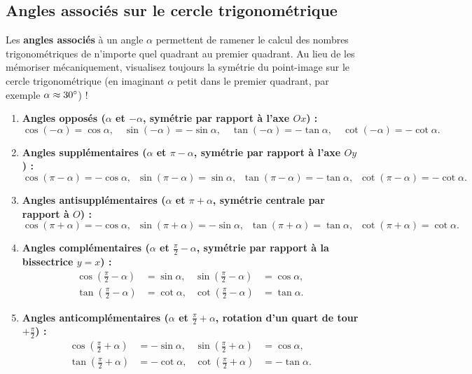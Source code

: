 \subsection{Angles associés sur le cercle trigonométrique}

Les \textbf{angles associés} à un angle $\alpha$ permettent de ramener le calcul des nombres trigonométriques de n'importe quel quadrant au premier quadrant. Au lieu de les mémoriser mécaniquement, visualisez toujours la symétrie du point-image sur le cercle trigonométrique (en imaginant $\alpha$ petit dans le premier quadrant, par exemple $\alpha \approx 30\degree$) !

\begin{theoreme}
\begin{enumerate}
    \item \textbf{Angles opposés ($\alpha$ et $-\alpha$, symétrie par rapport à l'axe $Ox$) :}
    \[
        \cos(-\alpha) = \cos\alpha, \quad \sin(-\alpha) = -\sin\alpha, \quad \tan(-\alpha) = -\tan\alpha, \quad \cot(-\alpha) = -\cot\alpha.
    \]
    \item \textbf{Angles supplémentaires ($\alpha$ et $\pi - \alpha$, symétrie par rapport à l'axe $Oy$) :}
    \[
        \cos(\pi-\alpha) = -\cos\alpha, \;\; \sin(\pi-\alpha) = \sin\alpha, \;\; \tan(\pi-\alpha) = -\tan\alpha, \;\; \cot(\pi-\alpha) = -\cot\alpha.
    \]
    \item \textbf{Angles antisupplémentaires ($\alpha$ et $\pi + \alpha$, symétrie centrale par rapport à $O$) :}
    \[
        \cos(\pi+\alpha) = -\cos\alpha, \;\; \sin(\pi+\alpha) = -\sin\alpha, \;\; \tan(\pi+\alpha) = \tan\alpha, \;\; \cot(\pi+\alpha) = \cot\alpha.
    \]
    \item \textbf{Angles complémentaires ($\alpha$ et $\frac{\pi}{2} - \alpha$, symétrie par rapport à la bissectrice $y=x$) :}
    \begin{align*}
        \cos\left(\frac{\pi}{2}-\alpha\right) &= \sin\alpha, & \sin\left(\frac{\pi}{2}-\alpha\right) &= \cos\alpha, \\
        \tan\left(\frac{\pi}{2}-\alpha\right) &= \cot\alpha, & \cot\left(\frac{\pi}{2}-\alpha\right) &= \tan\alpha.
    \end{align*}
    \item \textbf{Angles anticomplémentaires ($\alpha$ et $\frac{\pi}{2} + \alpha$, rotation d'un quart de tour $+\frac{\pi}{2}$) :}
    \begin{align*}
        \cos\left(\frac{\pi}{2}+\alpha\right) &= -\sin\alpha, & \sin\left(\frac{\pi}{2}+\alpha\right) &= \cos\alpha, \\
        \tan\left(\frac{\pi}{2}+\alpha\right) &= -\cot\alpha, & \cot\left(\frac{\pi}{2}+\alpha\right) &= -\tan\alpha.
    \end{align*}
\end{enumerate}
\end{theoreme}

